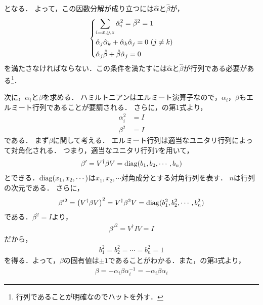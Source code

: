 \documentclass{report}
\begin{document}
    となる．
    よって，この因数分解が成り立つには$\bm{\hat{\alpha}}$と$\hat{\beta}$が，
    \begin{align}
      \begin{dcases}
        \sum_{i = x, y, z} \hat{\alpha}_i^2 = \hat{\beta}^2 = 1 \label{conditons-of-coefficients-of-dirac} \\
        \hat{\alpha}_j \hat{\alpha}_k + \hat{\alpha}_k \hat{\alpha}_j = 0\ (j \neq k)\\
        \hat{\alpha}_j \hat{\beta} + \hat{\beta} \hat{\alpha}_j = 0
      \end{dcases}
    \end{align}
    を満たさなければならない．この条件を満たすには$\bm{\hat{\alpha}}$と$\hat{\beta}$が行列である必要がある\footnote{行列であることが明確なのでハットを外す．}．
    \par
    次に，$\alpha_i$と$\beta$を求める．
    ハミルトニアンはエルミート演算子なので，$\alpha_i$，$\beta$もエルミート行列であることが要請される．
    さらに，の第1式より，
    \begin{align}
      \alpha_i^2 &= I \\ 
      \beta^2 &= I
    \end{align}
    である．
    まず$\beta$に関して考える．
    エルミート行列は適当なユニタリ行列によって対角化される．
    つまり，適当なユニタリ行列$V$を用いて，
    \begin{align}
      \beta' = V^\dagger \beta V = \operatorname{diag}(b_1, b_2, \cdots, b_n)
    \end{align}
    とできる．$\operatorname{diag}(x_1, x_2, \cdots)$は$x_1, x_2, \cdots$対角成分とする対角行列を表す．
    $n$は行列の次元である．
    さらに，
    \begin{align}
      \beta'^2 = \qty(V^\dagger \beta V)^2 = V^\dagger \beta^2 V = \operatorname{diag}(b_1^2, b_2^2, \cdots, b_n^2)
    \end{align}
    である．$\beta^2 = I$より，
    \begin{align}
      \beta'^2 = V^\dagger I V = I
    \end{align}
    だから，
    \begin{align}
      b_1^2 = b_2^2 = \cdots = b_n^2 = 1
    \end{align}
    を得る．よって，$\beta$の固有値は$\pm1$であることがわかる．また，の第3式より，
    \begin{align}
      \beta = - \alpha_i\beta\alpha_i^{-1} = -\alpha_i\beta\alpha_i
    \end{align}
\end{document}
